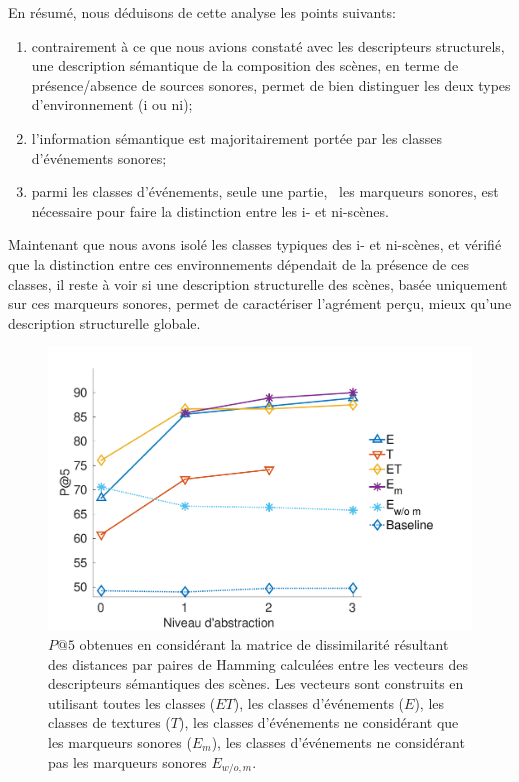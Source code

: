\documentclass[twoside,twocolumn]{article}
\begin{document}
En résumé, nous déduisons de cette analyse les points suivants:

\begin{enumerate}
\item contrairement à ce que nous avions constaté avec les descripteurs structurels, une description sémantique de la composition des scènes, en terme de présence/absence de sources sonores, permet de bien distinguer les deux types d'environnement (i ou ni);
\item l'information sémantique est majoritairement portée par les classes d'événements sonores;
\item parmi les classes d'événements, seule une partie, \ie~les marqueurs sonores, est nécessaire pour faire la distinction entre les i- et ni-scènes.
\end{enumerate}

Maintenant que nous avons isolé les classes typiques des i- et ni-scènes, et vérifié que la distinction entre ces environnements dépendait de la présence de ces classes, il reste à voir si une description structurelle des scènes, basée uniquement sur ces marqueurs sonores, permet de caractériser l'agrément perçu, mieux qu'une description structurelle globale.

\begin{figure}[t]
        \myfloatalign
        \includegraphics[width=\linewidth]{gfx/ch_5/pa5_1}
       \caption{$P@5$ obtenues en considérant la matrice de dissimilarité résultant des distances par paires de Hamming calculées entre les vecteurs des descripteurs sémantiques des scènes. Les vecteurs sont construits en utilisant toutes les classes ($ET$), les classes d'événements ($E$), les classes de textures ($T$), les classes d'événements ne considérant que les marqueurs sonores ($E_m$), les classes d'événements ne considérant pas les marqueurs sonores $E_{w/o,m}$.}\label{fig:pa5}
\end{figure}
\end{document}
